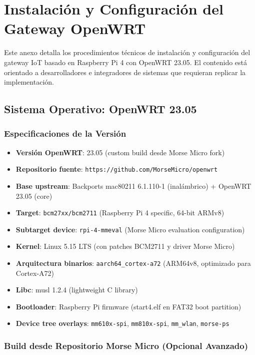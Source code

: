 ﻿\chapter{Instalación y Configuración del Gateway OpenWRT}
\label{anexo:instalacion}

Este anexo detalla los procedimientos técnicos de instalación y configuración del gateway IoT basado en Raspberry Pi 4 con OpenWRT 23.05. El contenido está orientado a desarrolladores e integradores de sistemas que requieran replicar la implementación.

\section{Sistema Operativo: OpenWRT 23.05}

\subsection{Especificaciones de la Versión}

\begin{itemize}
    \item \textbf{Versión OpenWRT}: 23.05 (custom build desde Morse Micro fork)~\cite{morsemicroOpenWRT2024}
    \item \textbf{Repositorio fuente}: \texttt{https://github.com/MorseMicro/openwrt}
    \item \textbf{Base upstream}: Backports mac80211 6.1.110-1 (inalámbrico) + OpenWRT 23.05 (core)
    \item \textbf{Target}: \texttt{bcm27xx/bcm2711} (Raspberry Pi 4 specific, 64-bit ARMv8)
    \item \textbf{Subtarget device}: \texttt{rpi-4-mmeval} (Morse Micro evaluation configuration)
    \item \textbf{Kernel}: Linux 5.15 LTS (con patches BCM2711 y driver Morse Micro)
    \item \textbf{Arquitectura binarios}: \texttt{aarch64\_cortex-a72} (ARM64v8, optimizado para Cortex-A72)
    \item \textbf{Libc}: musl 1.2.4 (lightweight C library)
    \item \textbf{Bootloader}: Raspberry Pi firmware (start4.elf en FAT32 boot partition)
    \item \textbf{Device tree overlays}: \texttt{mm610x-spi}, \texttt{mm810x-spi}, \texttt{mm\_wlan}, \texttt{morse-ps}
\end{itemize}

\subsection{Build desde Repositorio Morse Micro (Opcional Avanzado)}

